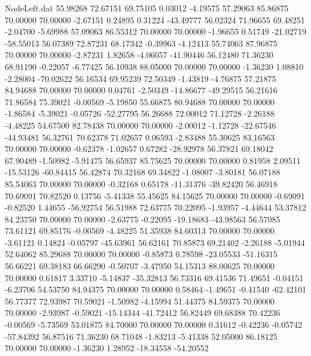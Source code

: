 \begin{filecontents}{NodeLeft.dat}
  55.98268   72.67151   69.75105     0.03012   -4.19575   57.29063   85.86875   70.00000   70.00000   -2.67151    0.24895    0.31224  -43.49777
  56.02324   71.96655   69.48251    -2.04700   -5.69988   57.09063   86.55312   70.00000   70.00000   -1.96655    0.51749  -21.02719  -58.55013
  56.07389   72.87231   68.17342    -0.39963   -4.12413   55.74063   87.96875   70.00000   70.00000   -2.87231    1.82658   -4.06057  -41.90446
  56.12480   71.36230   68.91190    -0.22057   -6.77425   56.10938   88.05000   70.00000   70.00000   -1.36230    1.08810   -2.28004  -70.02622
  56.16534   69.95239   72.50349    -1.43819   -4.76875   57.21875   84.94688   70.00000   70.00000    0.04761   -2.50349  -14.86677  -49.29515
  56.21616   71.86584   75.39021    -0.00569   -5.19850   55.66875   80.94688   70.00000   70.00000   -1.86584   -5.39021   -0.05726  -52.27795
  56.26688   72.00012   71.12728    -2.26188   -4.48225   54.67500   82.78438   70.00000   70.00000   -2.00012   -1.12728  -22.67546  -44.93481
  56.32761   70.62378   71.02657     0.06593   -2.83488   55.30625   83.16563   70.00000   70.00000   -0.62378   -1.02657    0.67282  -28.92978
  56.37821   69.18042   67.90489    -1.50982   -5.91475   56.65937   85.75625   70.00000   70.00000    0.81958    2.09511  -15.53126  -60.84415
  56.42874   70.32168   69.34822    -1.08007   -3.80181   56.07188   85.54063   70.00000   70.00000   -0.32168    0.65178  -11.31376  -39.82420
  56.46918   70.69091   70.82520     0.13756   -5.41338   55.45625   84.15625   70.00000   70.00000   -0.69091   -0.82520    1.44655  -56.92754
  56.51988   72.63775   70.22095    -1.93957   -4.44644   53.37812   84.23750   70.00000   70.00000   -2.63775   -0.22095  -19.18683  -43.98563
  56.57085   73.61121   69.85176    -0.00569   -4.48225   51.35938   84.60313   70.00000   70.00000   -3.61121    0.14824   -0.05797  -45.63961
  56.62161   70.85873   69.21402    -2.26188   -5.01944   52.64062   85.29688   70.00000   70.00000   -0.85873    0.78598  -23.05533  -51.16315
  56.66221   69.38183   66.66290    -0.50707   -3.47950   54.15313   88.00625   70.00000   70.00000    0.61817    3.33710   -5.14837  -35.32813
  56.73316   69.41536   71.49651    -0.04151   -6.23706   54.53750   84.94375   70.00000   70.00000    0.58464   -1.49651   -0.41540  -62.42101
  56.77377   72.93987   70.59021    -1.50982   -4.15994   51.44375   84.59375   70.00000   70.00000   -2.93987   -0.59021  -15.14344  -41.72412
  56.82449   69.68388   70.42236    -0.00569   -5.73569   53.01875   84.70000   70.00000   70.00000    0.31612   -0.42236   -0.05742  -57.84392
  56.87516   71.36230   68.71048    -1.83213   -5.41338   52.05000   86.18125   70.00000   70.00000   -1.36230    1.28952  -18.34558  -54.20552

\end{filecontents}
